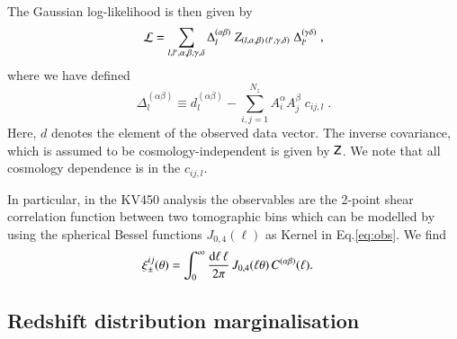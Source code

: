 \documentclass{aa}
\newcommand{\eq}[1]{\begin{equation}  #1 \end{equation}}
\newcommand{\eqa}[1]{\begin{align}   #1 \end{align}}
\newcommand{\dd}{{\rm d}}
\begin{document}
The Gaussian log-likelihood is then given by
\eq{
{\cal L} = \sum_{l,l',\alpha,\beta,\gamma,\delta} \Delta_l^{(\alpha \beta)}\; Z_{(l,\alpha,\beta) \,  (l',\gamma,\delta)}\; \Delta_{l'}^{(\gamma \delta)}\;,
}
where we have defined
\eq{
\Delta_l^{(\alpha \beta)} \equiv d_l^{(\alpha \beta)} - \sum_{i,j=1}^{N_z} A_i^\alpha A_j^\beta\; c_{ij,l}\;.
}
Here, $d$ denotes the element of the observed data vector. The inverse covariance, which is assumed to be cosmology-independent is given by $\mathsf{Z}$. We note that all cosmology dependence is in the $c_{ij,l}$.

In particular, in the KV450 analysis the observables are the 2-point shear correlation function between two tomographic bins which can be modelled by using the spherical Bessel functions $J_{0,4}(\ell)$ as Kernel in Eq.\ref{eq:obs}. We find
\eqa{
\xi_\pm^{ij}(\theta) &= \int_0^\infty \frac{\dd \ell\, \ell}{2 \pi}\,J _{0,4}(\ell \theta)\, C^{(\alpha \beta)}(\ell).
}

\subsection{Redshift distribution marginalisation}
\end{document}
